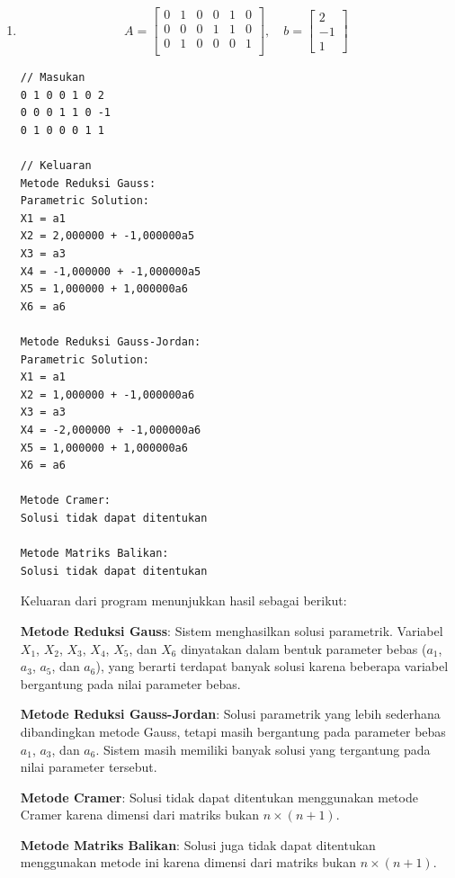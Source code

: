 \begin{enumerate}[label=(\alph*)]
\pagebreak
    \item 
    \[ A = \begin{bmatrix}
    0 & 1 & 0 & 0 & 1 & 0 \\
    0 & 0 & 0 & 1 & 1 & 0 \\
    0 & 1 & 0 & 0 & 0 & 1 \\
\end{bmatrix}, \quad b =
\begin{bmatrix}
    2 \\ -1 \\ 1
\end{bmatrix}\]

\begin{lstlisting}[caption = spl-1c.txt]
// Masukan
0 1 0 0 1 0 2
0 0 0 1 1 0 -1
0 1 0 0 0 1 1

// Keluaran
Metode Reduksi Gauss:
Parametric Solution:
X1 = a1
X2 = 2,000000 + -1,000000a5
X3 = a3
X4 = -1,000000 + -1,000000a5
X5 = 1,000000 + 1,000000a6
X6 = a6

Metode Reduksi Gauss-Jordan:
Parametric Solution:
X1 = a1
X2 = 1,000000 + -1,000000a6
X3 = a3
X4 = -2,000000 + -1,000000a6
X5 = 1,000000 + 1,000000a6
X6 = a6

Metode Cramer:
Solusi tidak dapat ditentukan

Metode Matriks Balikan:
Solusi tidak dapat ditentukan\end{lstlisting}

Keluaran dari program menunjukkan hasil sebagai berikut:

\textbf{Metode Reduksi Gauss}: Sistem menghasilkan solusi parametrik. Variabel \( X_1 \), \( X_2 \), \( X_3 \), \( X_4 \), \( X_5 \), dan \( X_6 \) dinyatakan dalam bentuk parameter bebas (\( a_1 \), \( a_3 \), \( a_5 \), dan \( a_6 \)), yang berarti terdapat banyak solusi karena beberapa variabel bergantung pada nilai parameter bebas.

\textbf{Metode Reduksi Gauss-Jordan}: Solusi parametrik yang lebih sederhana dibandingkan metode Gauss, tetapi masih bergantung pada parameter bebas \( a_1 \), \( a_3 \), dan \( a_6 \). Sistem masih memiliki banyak solusi yang tergantung pada nilai parameter tersebut.

\textbf{Metode Cramer}: Solusi tidak dapat ditentukan menggunakan metode Cramer karena dimensi dari matriks bukan \(n \times (n+1)\). 

\textbf{Metode Matriks Balikan}: Solusi juga tidak dapat ditentukan menggunakan metode ini karena dimensi dari matriks bukan \(n \times (n+1)\).


\end{enumerate}
